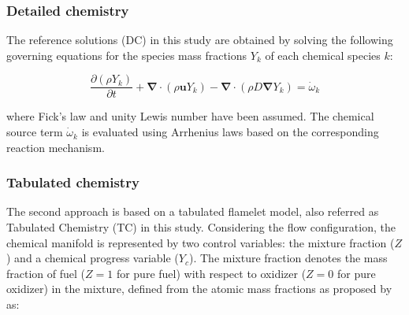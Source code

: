\documentclass[preprint,12pt,authoryear]{elsarticle}
\begin{document}

\subsubsection{Detailed chemistry}

The reference solutions (DC) in this study are obtained by solving the following governing equations for the species mass fractions $Y_k$ of each chemical species $k$:

\begin{equation}
\label{eqn:species_FRC}
\frac{\partial \left( \rho Y_k \right)}{\partial t} + \bm{\nabla} \cdot \left( \rho \textbf{u} Y_k \right) - \bm{\nabla} \cdot \left( \rho D \bm{\nabla}  Y_k  \right) = \dot{\omega}_k
\end{equation}

where Fick's law and unity Lewis number have been assumed. The chemical source term $\dot{\omega}_k$ is evaluated using Arrhenius laws based on the corresponding reaction mechanism. 





\subsubsection{Tabulated chemistry}

The second approach is based on a tabulated flamelet model, also referred as Tabulated Chemistry (TC) in this study. Considering the flow configuration, the chemical manifold is represented by two control variables: the mixture fraction ($Z$) and a chemical progress variable ($Y_c$). The mixture fraction denotes the mass fraction of fuel ($Z = 1$ for pure fuel) with respect to oxidizer ($Z = 0$ for pure oxidizer) in the mixture, defined from the atomic mass fractions as proposed by \cite{bilger_reduced_1990} as:
\end{document}

